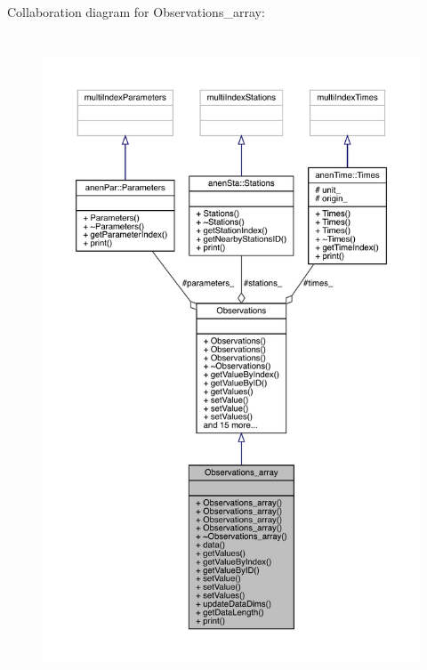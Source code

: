 Collaboration diagram for Observations\+\_\+array\+:\nopagebreak
\begin{figure}[H]
\begin{center}
\leavevmode
\includegraphics[height=550pt]{class_observations__array__coll__graph}
\end{center}
\end{figure}
